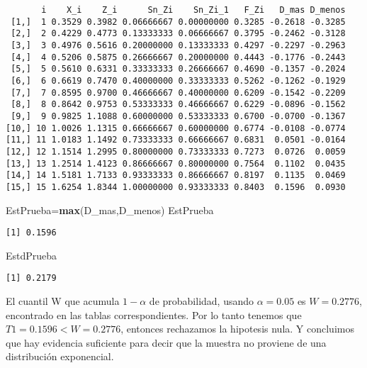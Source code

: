 \documentclass[
  a4paper,
  oneside,
  openany]{book}
\newenvironment{Shaded}{\begin{snugshade}}{\end{snugshade}}
\newcommand{\KeywordTok}[1]{\textcolor[rgb]{0.13,0.29,0.53}{\textbf{#1}}}
\newcommand{\NormalTok}[1]{#1}
\begin{document}
\begin{verbatim}
       i    X_i    Z_i      Sn_Zi    Sn_Zi_1   F_Zi   D_mas D_menos
 [1,]  1 0.3529 0.3982 0.06666667 0.00000000 0.3285 -0.2618 -0.3285
 [2,]  2 0.4229 0.4773 0.13333333 0.06666667 0.3795 -0.2462 -0.3128
 [3,]  3 0.4976 0.5616 0.20000000 0.13333333 0.4297 -0.2297 -0.2963
 [4,]  4 0.5206 0.5875 0.26666667 0.20000000 0.4443 -0.1776 -0.2443
 [5,]  5 0.5610 0.6331 0.33333333 0.26666667 0.4690 -0.1357 -0.2024
 [6,]  6 0.6619 0.7470 0.40000000 0.33333333 0.5262 -0.1262 -0.1929
 [7,]  7 0.8595 0.9700 0.46666667 0.40000000 0.6209 -0.1542 -0.2209
 [8,]  8 0.8642 0.9753 0.53333333 0.46666667 0.6229 -0.0896 -0.1562
 [9,]  9 0.9825 1.1088 0.60000000 0.53333333 0.6700 -0.0700 -0.1367
[10,] 10 1.0026 1.1315 0.66666667 0.60000000 0.6774 -0.0108 -0.0774
[11,] 11 1.0183 1.1492 0.73333333 0.66666667 0.6831  0.0501 -0.0164
[12,] 12 1.1514 1.2995 0.80000000 0.73333333 0.7273  0.0726  0.0059
[13,] 13 1.2514 1.4123 0.86666667 0.80000000 0.7564  0.1102  0.0435
[14,] 14 1.5181 1.7133 0.93333333 0.86666667 0.8197  0.1135  0.0469
[15,] 15 1.6254 1.8344 1.00000000 0.93333333 0.8403  0.1596  0.0930
\end{verbatim}

\begin{Shaded}
\begin{Highlighting}[]
\NormalTok{EstPrueba=}\KeywordTok{max}\NormalTok{(D\_mas,D\_menos)}
\NormalTok{EstPrueba}
\end{Highlighting}
\end{Shaded}

\begin{verbatim}
[1] 0.1596
\end{verbatim}

\begin{Shaded}
\begin{Highlighting}[]
\NormalTok{EstdPrueba}
\end{Highlighting}
\end{Shaded}

\begin{verbatim}
[1] 0.2179
\end{verbatim}

El cuantil W que acumula \(1-\alpha\) de probabilidad, usando \(\alpha=0.05\) es \(W = 0.2776\), encontrado en las tablas correspondientes. Por lo tanto tenemos que \(T1=0.1596 < W=0.2776\), entonces rechazamos la hipotesis nula. Y concluimos que hay evidencia suficiente para decir que la muestra no proviene de una distribución exponencial.
\end{document}
